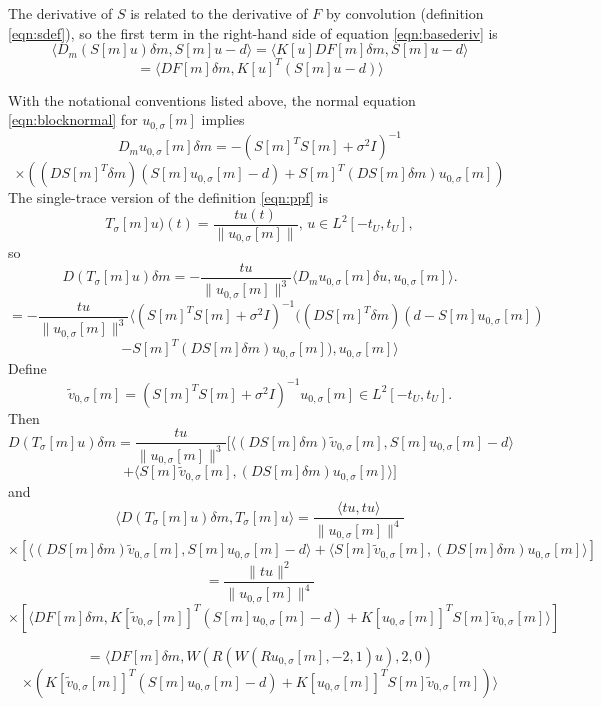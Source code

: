 The derivative of $S$ is related to the derivative of $F$ by
convolution (definition \ref{eqn:sdef}), so the first term in the
right-hand side of equation \ref{eqn:basederiv} is
\[
  \langle D_m(S[m]u)\delta m, S[m]u-d \rangle = \langle
  K[u]DF[m]\delta m, S[m]u-d \rangle
\]
\begin{equation}
  \label{eqn:resderiv}
  = \langle DF[m]\delta m, K[u]^T(S[m]u-d) \rangle
\end{equation}

With the notational conventions listed above, the normal equation \ref{eqn:blocknormal} for $u_{0,\sigma}[m]$ implies
\[
  D_mu_{0,\sigma}[m] \delta m = -(S[m]^TS[m] + \sigma^2I)^{-1}
\]
\begin{equation}
  \label{eqn:blockderiv}
  \times ((DS[m]^{T}\delta m) (S[m]u_{0,\sigma}[m]-d) + S[m]^T(DS[m]\delta m) u_{0,\sigma}[m])
\end{equation}
The single-trace version of the definition \ref{eqn:ppf} is
\[
  T_{\sigma}[m]u)(t) = \frac{t u(t)}{\|u_{0,\sigma}[m]\|},\,u \in L^2[-t_U,t_U],
\]
so
\[
D(T_{\sigma}[m] u)\delta m = -\frac{t u}{\|u_{0,\sigma}[m]\|^3}\langle D_mu_{0,\sigma}[m]\delta u, u_{0,\sigma}[m]\rangle.
\]
\[
  =-\frac{t u}{\|u_{0,\sigma}[m]\|^3}\langle  (S[m]^TS[m] +
  \sigma^2I)^{-1}((DS[m]^{T}\delta m) (d - S[m]u_{0,\sigma}[m])
\]
\[
   - S[m]^T(DS[m]\delta m) u_{0,\sigma}[m]), u_{0,\sigma}[m] \rangle
\]
Define
\begin{equation}
  \label{eqn:defv0tilde}
  \tilde{v}_{0,\sigma}[m] = (S[m]^TS[m]+ \sigma^2I)^{-1} u_{0,\sigma}[m] \in
  L^2[-t_U,t_U].
\end{equation}
Then
\[
  D(T_{\sigma}[m] u)\delta m =
  \frac{t u}{\|u_{0,\sigma}[m]\|^3}[\langle (DS[m]\delta
  m)\tilde{v}_{0,\sigma}[m], S[m]u_{0,\sigma}[m]-d\rangle
\]
\[+
  \langle S[m]\tilde{v}_{0,\sigma}[m], (DS[m]\delta m) u_{0,\sigma}[m] \rangle ]
\]
and
\[
  \langle D(T_{\sigma}[m]u)\delta m, T_{\sigma}[m]u\rangle =
\frac{\langle t u, tu \rangle}{\|u_{0,\sigma}[m]\|^4}
\]
\[
\times [\langle (DS[m]\delta
  m)\tilde{v}_{0,\sigma}[m], S[m]u_{0,\sigma}[m]-d\rangle
+
  \langle S[m]\tilde{v}_{0,\sigma}[m], (DS[m]\delta m) u_{0,\sigma}[m] \rangle ]
\]
\[
  = \frac {\|t u\|^2}{\|u_{0,\sigma}[m]\|^4}
\]
\[
  \times [\langle DF[m]\delta m, K[\tilde{v}_{0,\sigma}[m]]^T(S[m]u_{0,\sigma}[m]-d)
+
K[u_{0,\sigma}[m]]^T S[m]\tilde{v}_{0,\sigma}[m]\rangle ]
\]

\[
  = \langle DF[m]\delta m, W(R(W(Ru_{0,\sigma}[m],-2,1)u),2,0)
\]
\begin{equation}
  \label{eqn:penderiv}
  \times ( K[\tilde{v}_{0,\sigma}[m]]^T(S[m]u_{0,\sigma}[m]-d)
+
K[u_{0,\sigma}[m]]^T S[m]\tilde{v}_{0,\sigma}[m])\rangle
\end{equation}

